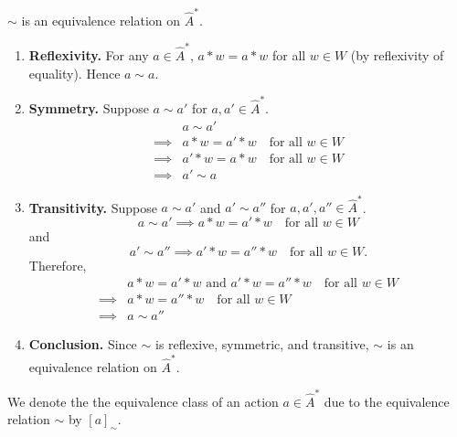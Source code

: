 \begin{propositionE}
    $\sim$ is an equivalence relation on $\hat{A}^{\ast}$.
\end{propositionE}
\begin{proofE}
\begin{enumerate}
    \item \textbf{Reflexivity.}
    For any $a \in \hat{A}^{*}$, $a \ast w = a \ast w$ for all $w \in W$ (by reflexivity of equality). Hence $a \sim a$.
    
    \item \textbf{Symmetry.}
    Suppose $a \sim a'$ for $a, a' \in \hat{A}^{*}$.
    \begin{align}
        & a \sim a' \\
        \implies & a \ast w = a' \ast w \quad \text{for all $w \in W$} \\
        \implies & a' \ast w = a \ast w \quad \text{for all $w \in W$} \\
        \implies & a' \sim a
    \end{align}
    
    \item \textbf{Transitivity.}
    Suppose $a \sim a'$ and $a' \sim a''$ for $a, a', a'' \in \hat{A}^{*}$.
    \begin{equation}
        a \sim a' \implies a \ast w = a' \ast w \quad \text{for all $w \in W$}
    \end{equation}
    and
    \begin{equation}
        a' \sim a'' \implies a' \ast w = a'' \ast w \quad \text{for all $w \in W$}.
    \end{equation}
    Therefore,
    \begin{align}
        & a \ast w = a' \ast w \text{ and } a' \ast w = a'' \ast w \quad \text{for all $w \in W$} \\
        \implies & a \ast w = a'' \ast w \quad \text{for all $w \in W$} \\
        \implies & a \sim a''
    \end{align}

    \item \textbf{Conclusion.}
    Since $\sim$ is reflexive, symmetric, and transitive, $\sim$ is an equivalence relation on $\hat{A}^{*}$.
\end{enumerate}
\end{proofE}

\begin{notation}
    We denote the the equivalence class of an action $a \in \hat{A}^{*}$ due to the equivalence relation $\sim$ by  $[a]_{\sim}$.
\end{notation}

